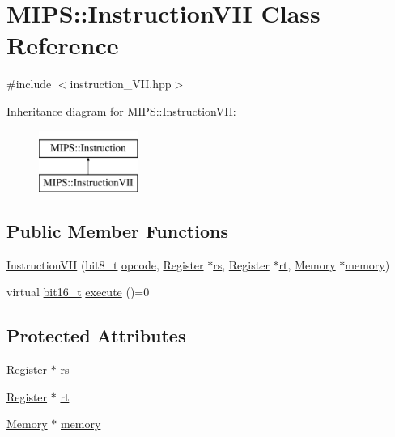 \hypertarget{classMIPS_1_1InstructionVII}{}\section{M\+I\+PS\+:\+:Instruction\+V\+II Class Reference}
\label{classMIPS_1_1InstructionVII}


{\ttfamily \#include $<$instruction\+\_\+\+V\+I\+I.\+hpp$>$}

Inheritance diagram for M\+I\+PS\+:\+:Instruction\+V\+II\+:\begin{figure}[H]
\begin{center}
\leavevmode
\includegraphics[height=2.000000cm]{classMIPS_1_1InstructionVII}
\end{center}
\end{figure}
\subsection*{Public Member Functions}
\begin{DoxyCompactItemize}
\item 
\hyperlink{classMIPS_1_1InstructionVII_a43d5166f940af6178bd179ea81df6a55}{Instruction\+V\+II} (\hyperlink{core_8hpp_a6074bae122ae7b527864eec42c728c3c}{bit8\+\_\+t} \hyperlink{classMIPS_1_1Instruction_a45cc6808b5dde8a5d41067d148b55476}{opcode}, \hyperlink{classMIPS_1_1Register}{Register} $\ast$\hyperlink{classMIPS_1_1InstructionVII_a8e51202e0b22f8e74668f6de95089e60}{rs}, \hyperlink{classMIPS_1_1Register}{Register} $\ast$\hyperlink{classMIPS_1_1InstructionVII_a8710c06b6e7816f330b0c5daea3402a4}{rt}, \hyperlink{classMIPS_1_1Memory}{Memory} $\ast$\hyperlink{classMIPS_1_1InstructionVII_a4fb34750bedbf137b43f9b55b591e0d7}{memory})
\item 
virtual \hyperlink{core_8hpp_adc265a970bc35995b5879784bbb3f1b7}{bit16\+\_\+t} \hyperlink{classMIPS_1_1InstructionVII_ab004a9cdc0efa7afacb964352abf3ee7}{execute} ()=0
\end{DoxyCompactItemize}
\subsection*{Protected Attributes}
\begin{DoxyCompactItemize}
\item 
\hyperlink{classMIPS_1_1Register}{Register} $\ast$ \hyperlink{classMIPS_1_1InstructionVII_a8e51202e0b22f8e74668f6de95089e60}{rs}
\item 
\hyperlink{classMIPS_1_1Register}{Register} $\ast$ \hyperlink{classMIPS_1_1InstructionVII_a8710c06b6e7816f330b0c5daea3402a4}{rt}
\item 
\hyperlink{classMIPS_1_1Memory}{Memory} $\ast$ \hyperlink{classMIPS_1_1InstructionVII_a4fb34750bedbf137b43f9b55b591e0d7}{memory}
\end{DoxyCompactItemize}


